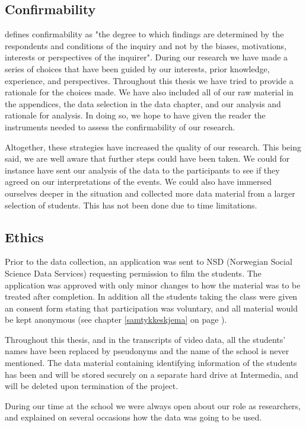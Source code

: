 \subsection{Confirmability}
\citet{lincoln1985naturalistic} defines confirmability as "the degree to which findings are determined by the respondents and conditions of the inquiry and not by the biases, motivations, interests or perspectives of the inquirer". During our research we have made a series of choices that have been guided by our interests, prior knowledge, experience, and perspectives. Throughout this thesis we have tried to provide a rationale for the choices made. We have also included all of our raw material in the appendices, the data selection in the data chapter, and our analysis and rationale for analysis. In doing so, we hope to have given the reader the instruments needed to assess the confirmability of our research.  

Altogether, these strategies have increased the quality of our research. This being said, we are well aware that further steps could have been taken. We could for instance have sent our analysis of the data to the participants to see if they agreed on our interpretations of the events. We could also have immersed ourselves deeper in the situation and collected more data material from a larger selection of students. This has not been done due to time limitations. 

\subsection{Ethics}
Prior to the data collection, an application was sent to NSD (Norwegian Social Science Data Services) requesting permission to film the students. The application was approved with only minor changes to how the material was to be treated after completion. In addition all the students taking the class were given an consent form stating that participation was voluntary, and all material would be kept anonymous (see chapter \ref{samtykkeskjema} on page \pageref{samtykkeskjema}). 

Throughout this thesis, and in the transcripts of video data, all the students' names have been replaced by pseudonyms and the name of the school is never mentioned. The data material containing identifying information of the students has been and will be stored securely on a separate hard drive at Intermedia, and will be deleted  upon termination of the project. 

During our time at the school we were always open about our role as researchers, and explained on several occasions how the data was going to be used. 

